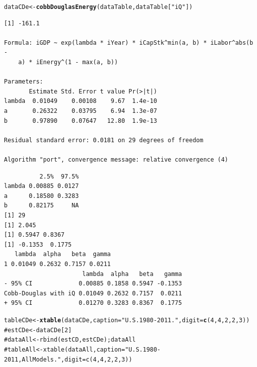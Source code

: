 \documentclass[preprint,authoryear,12pt]{elsarticle}\usepackage{graphicx, color}
\makeatletter
\newcommand{\hlfunctioncall}[1]{\textcolor[rgb]{0.501960784313725,0,0.329411764705882}{\textbf{#1}}}%
\newcommand{\hlstring}[1]{\textcolor[rgb]{0.6,0.6,1}{#1}}%
\newcommand{\hlcomment}[1]{\textcolor[rgb]{0.180392156862745,0.6,0.341176470588235}{#1}}%
\newenvironment{kframe}{%
 \def\at@end@of@kframe{}%
 \ifinner\ifhmode%
  \def\at@end@of@kframe{\end{minipage}}%
  \begin{minipage}{\columnwidth}%
 \fi\fi%
 \def\FrameCommand##1{\hskip\@totalleftmargin \hskip-\fboxsep
 \colorbox{shadecolor}{##1}\hskip-\fboxsep
     \hskip-\linewidth \hskip-\@totalleftmargin \hskip\columnwidth}%
 \MakeFramed {\advance\hsize-\width
   \@totalleftmargin\z@ \linewidth\hsize
   \@setminipage}}%
 {\par\unskip\endMakeFramed%
 \at@end@of@kframe}
\newenvironment{knitrout}{}{} %
\makeatother
\begin{document}
\begin{knitrout}
\color{fgcolor}\begin{kframe}
\begin{alltt}
dataCDe <- \hlfunctioncall{cobbDouglasEnergy}(dataTable, dataTable[\hlstring{"iQ"}])
\end{alltt}
\begin{verbatim}
[1] -161.1

Formula: iGDP ~ exp(lambda * iYear) * iCapStk^min(a, b) * iLabor^abs(b - 
    a) * iEnergy^(1 - max(a, b))

Parameters:
       Estimate Std. Error t value Pr(>|t|)
lambda  0.01049    0.00108    9.67  1.4e-10
a       0.26322    0.03795    6.94  1.3e-07
b       0.97890    0.07647   12.80  1.9e-13

Residual standard error: 0.0181 on 29 degrees of freedom

Algorithm "port", convergence message: relative convergence (4) 
\end{verbatim}


{\ttfamily\noindent\itshape\color{messagecolor}{Waiting for profiling to be done...}}\begin{verbatim}
          2.5%  97.5%
lambda 0.00885 0.0127
a      0.18580 0.3283
b      0.82175     NA
[1] 29
[1] 2.045
[1] 0.5947 0.8367
[1] -0.1353  0.1775
   lambda  alpha   beta  gamma
1 0.01049 0.2632 0.7157 0.0211
                      lambda  alpha   beta   gamma
- 95% CI             0.00885 0.1858 0.5947 -0.1353
Cobb-Douglas with iQ 0.01049 0.2632 0.7157  0.0211
+ 95% CI             0.01270 0.3283 0.8367  0.1775
\end{verbatim}
\begin{alltt}
tableCDe <- \hlfunctioncall{xtable}(dataCDe, caption=\hlstring{"U.S. 1980-2011."}, digit = \hlfunctioncall{c}(4, 4, 2, 2, 3))
\hlcomment{#estCDe <- dataCDe[2]}
\hlcomment{#dataAll <- rbind(estCD, estCDe); dataAll}
\hlcomment{#tableAll <- xtable(dataAll, caption="U.S. 1980-2011, All Models.", digit = c(4, 4, 2, 2, 3))}
\end{alltt}
\end{kframe}
\end{knitrout}
\end{document}
